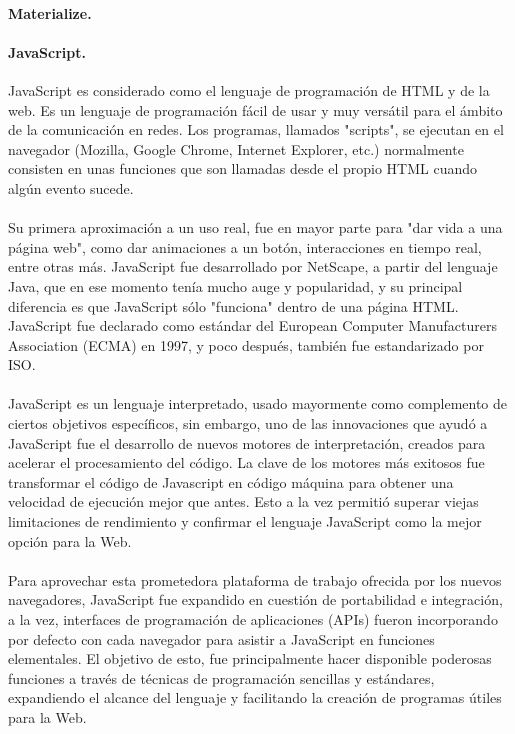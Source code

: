 \documentclass[12pt, a4paper, titlepage]{article}
\begin{document}
				\paragraph{Materialize. \\}
				
				
				
				\paragraph {JavaScript. \\}
				JavaScript es considerado como el lenguaje de programación de HTML y de la web. Es un lenguaje de programación fácil de usar y muy versátil para el ámbito de la comunicación en redes. Los programas, llamados "scripts", se ejecutan en el navegador (Mozilla, Google Chrome, Internet Explorer, etc.) normalmente consisten en unas funciones que son llamadas desde el propio HTML cuando algún evento sucede.\\\\
				Su primera aproximación a un uso real, fue en mayor parte para "dar vida a una página web", como dar animaciones a un botón, interacciones en tiempo real, entre otras más. 
				JavaScript fue desarrollado por \Gls{NetScape}, a partir del lenguaje Java, que en ese momento tenía mucho auge y popularidad, y su principal diferencia es que JavaScript sólo "funciona" dentro de una página HTML.\\
				JavaScript fue declarado como estándar del European Computer Manufacturers Association (ECMA) en 1997, y poco después, también fue estandarizado por ISO.\cite{refJavaScript} \\\\ 
				JavaScript es un lenguaje interpretado, usado mayormente como complemento de ciertos objetivos específicos, sin embargo, uno de las innovaciones que ayudó a JavaScript fue el desarrollo de nuevos motores de interpretación, creados para acelerar el procesamiento del código. La clave de los motores más exitosos fue transformar el código de Javascript en código máquina para obtener una velocidad de ejecución mejor que antes. Esto a la vez permitió superar viejas limitaciones de rendimiento y confirmar el lenguaje JavaScript como la mejor opción para la Web.\\\\
				Para aprovechar esta prometedora plataforma de trabajo ofrecida por los nuevos navegadores, JavaScript fue expandido en cuestión de portabilidad e integración, a la vez, interfaces de programación de aplicaciones (APIs) fueron incorporando por defecto con cada navegador para asistir a JavaScript en funciones elementales. El objetivo de esto, fue principalmente hacer disponible poderosas funciones a través de técnicas de programación sencillas y estándares, expandiendo el alcance del lenguaje y facilitando la creación de programas útiles para la Web.\cite{refElGranLibro}
				
\end{document}
